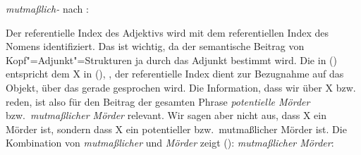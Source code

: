 \ea
\emph{mutmaßlich-} nach \citep*[]{ps2}:\\
\samepage
{}
\z

\noindent
Der referentielle Index des Adjektivs wird mit dem referentiellen Index des Nomens identifiziert.
Das ist wichtig, da der semantische Beitrag von Kopf"=Adjunkt"=Strukturen ja durch das Adjunkt
bestimmt wird. Die  in () entspricht dem X in (), \dash, der referentielle
Index dient zur Bezugnahme auf das Objekt, über das gerade gesprochen wird.  Die Information, dass
wir über X bzw.\  reden, ist also für den Beitrag der gesamten Phrase \emph{potentielle
Mörder} bzw.\ \emph{mutmaßlicher Mörder} relevant. Wir sagen aber nicht aus,
dass X ein Mörder ist, sondern dass X ein potentieller bzw.\ mutmaßlicher Mörder ist. Die Kombination von
\emph{mutmaßlicher} und \emph{Mörder} zeigt ():
\ea
\emph{mutmaßlicher Mörder}:\\
\samepage
{}
\z



